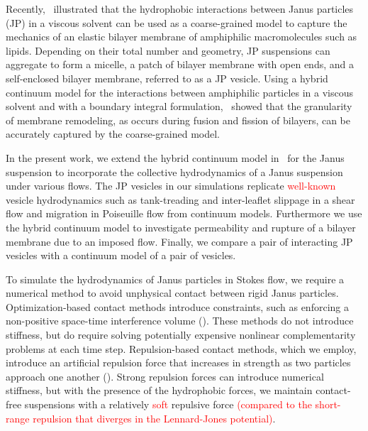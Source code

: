 \documentclass[lineno]{jfm}
\newcommand{\ReviewerOne}[1]{\textcolor{red}{#1}}
\begin{document}
Recently,~\cite{Fu20} illustrated that the hydrophobic interactions
between Janus particles (JP) in a viscous solvent can be used as a
coarse-grained model to capture the mechanics of an elastic bilayer
membrane of amphiphilic macromolecules such as lipids. Depending on
their total number and geometry, JP suspensions can aggregate to form a
micelle, a patch of bilayer membrane with open ends, and a self-enclosed
bilayer membrane, referred to as a JP vesicle. Using a hybrid continuum
model for the interactions between amphiphilic particles in a viscous
solvent and with a boundary integral formulation,~\cite{Fu20} showed
that the granularity of membrane remodeling, as occurs during fusion and
fission of bilayers, can be accurately captured by the coarse-grained
model.  

In the present work, we extend the hybrid continuum model in~\cite{Fu20}
for the Janus suspension to incorporate the collective hydrodynamics of
a Janus suspension under various flows. The JP vesicles in our
simulations replicate  \ReviewerOne{well-known} vesicle hydrodynamics
such as tank-treading and inter-leaflet slippage in a shear flow and
migration in Poiseuille flow from continuum models. Furthermore we use
the hybrid continuum model to investigate permeability and rupture of a
bilayer membrane due to an imposed flow.  Finally, we compare a pair of
interacting JP vesicles with a continuum model of a pair of vesicles.


To simulate the hydrodynamics of Janus particles in Stokes flow,
we require a numerical method to avoid unphysical contact between rigid
Janus particles. Optimization-based contact methods introduce
constraints, such as enforcing a non-positive space-time interference
volume (\cite{lu-rah-zor2017, Lukas19, yan-cor-mal-vee-she2020}). These
methods do not introduce stiffness, but do require solving potentially
expensive nonlinear complementarity problems at each time step.
Repulsion-based contact methods, which we employ, introduce an
artificial repulsion force that increases in strength as two particles
approach one another (\cite{glo-pan-hes-jos-per2001, fen-mic2004,
kab-qua-bir2018}). Strong repulsion forces can introduce numerical
stiffness, but with the presence of the hydrophobic forces, we maintain
contact-free suspensions with a relatively \textcolor{red}{soft} repulsive
force \textcolor{red}{(compared to the short-range repulsion that diverges in the Lennard-Jones potential)}.
\end{document}
